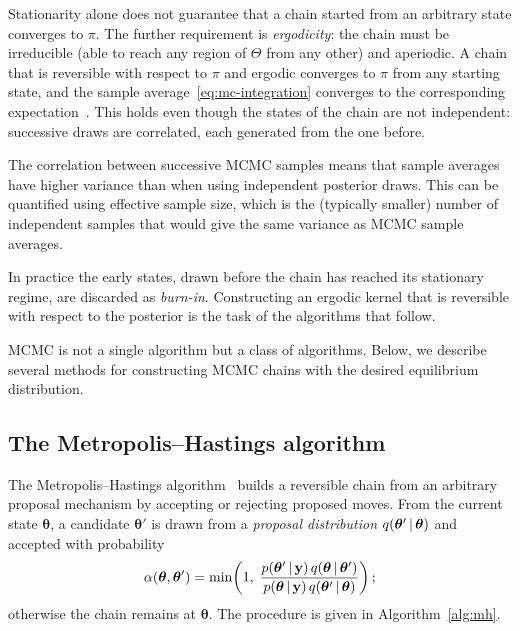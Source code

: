 Stationarity alone does not guarantee that a chain started from an
arbitrary state converges to $\pi$. The further requirement is
\emph{ergodicity}: the chain must be irreducible (able to reach any
region of $\Theta$ from any other) and aperiodic. A chain that is
reversible with respect to $\pi$ and ergodic converges to $\pi$ from
any starting state, and the sample
average~\eqref{eq:mc-integration} converges to the corresponding
expectation~\citep{robert2004monte, brooks2011handbook}. This holds even though the states
of the chain are not independent: successive draws are correlated,
each generated from the one before. 

The correlation between successive MCMC samples means that sample averages have higher variance than when using independent posterior draws. This can be quantified using effective sample size, which is the (typically smaller) number of independent samples that would give the same variance as MCMC sample averages.

In practice the early states, drawn before the chain has reached its stationary regime, are
discarded as \emph{burn-in}. Constructing an ergodic kernel that is
reversible with respect to the posterior is the task of the algorithms
that follow.

MCMC is not a single algorithm but a class of algorithms. Below, we describe several methods for constructing MCMC chains with the desired equilibrium distribution.

\subsection{The Metropolis--Hastings algorithm}
\label{sec:metropolis-hastings}

The Metropolis--Hastings algorithm~\citep{metropolis1953equation,
hastings1970mcmc} builds a reversible chain from an arbitrary proposal
mechanism by accepting or rejecting proposed moves. From the current
state $\bm{\theta}$, a candidate $\bm{\theta}'$ is drawn from a
\emph{proposal distribution} $q(\bm{\theta}' \,|\, \bm{\theta})$ and
accepted with probability
%
\begin{equation}
  \alpha(\bm{\theta}, \bm{\theta}')
  = \min\!\left(1,\;
  \frac{p(\bm{\theta}' \,|\, \mathbf{y})\,
        q(\bm{\theta} \,|\, \bm{\theta}')}
       {p(\bm{\theta} \,|\, \mathbf{y})\,
        q(\bm{\theta}' \,|\, \bm{\theta})}\right);
  \label{eq:mh-acceptance}
\end{equation}
%
otherwise the chain remains at $\bm{\theta}$. The procedure is given
in Algorithm~\ref{alg:mh}.

